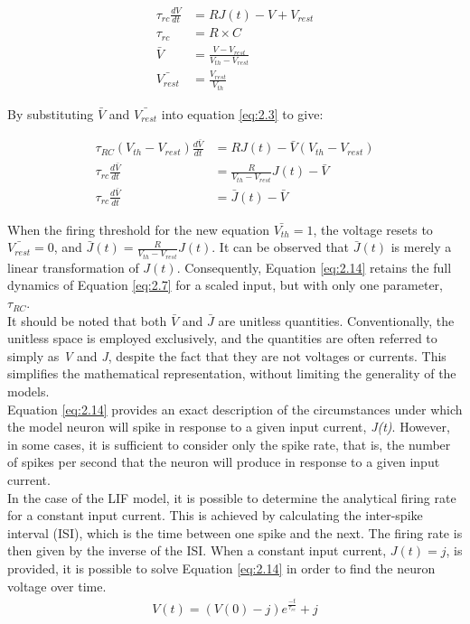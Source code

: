 \begin{align}
\tau_{rc} \frac{dV}{dt} &= RJ(t) - V + V_{rest} \label{eq:2.8} \\
\tau_{rc} &= R \times C \label{eq:2.9} \\
\bar{V} &= \frac{V - V_{rest}}{V_{th} - V_{rest}} \label{eq:2.10} \\
\bar{V_{rest}} &= \frac{V_{rest}}{V_{th}} \label{eq:2.11} 
\end{align}

\noindent By substituting $\bar{V}$ and $\bar{V_{rest}}$ into equation \ref{eq:2.3} to give:


\begin{align}
\tau_{RC}(V_{th} - V_{rest})\frac{d\bar{V}}{dt} &= RJ(t) - \bar{V}(V_{th} - V_{rest})
 \label{eq:2.12} \\
\tau_{rc}\frac{d\bar{V}}{dt} &= \frac{R}{V_{th} - V_{rest}} J(t) - \bar{V} \label{eq:2.13} \\
\tau_{rc} \frac{d\bar{V}}{dt} &= \bar{J}(t) - \bar{V} \label{eq:2.14} 
\end{align}

\noindent When the firing threshold for the new equation $\bar{V_{th}} = 1$, the voltage resets to $\bar{V_{rest}} = 0$, and $\bar{J}(t) = \frac{R}{V_{th} - V_{rest}} J(t)$. It can be observed that $\bar{J}(t)$ is merely a linear transformation of $J(t)$. Consequently, Equation \ref{eq:2.14} retains the full dynamics of Equation \ref{eq:2.7} for a scaled input, but with only one parameter, $\tau_{RC}$. \\

\noindent It should be noted that both $\bar{V}$ and $\bar{J}$ are unitless quantities. Conventionally, the unitless space is employed exclusively, and the quantities are often referred to simply as \textit{V} and \textit{J}, despite the fact that they are not voltages or currents. This simplifies the mathematical representation, without limiting the generality of the models. \\

\noindent Equation \ref{eq:2.14} provides an exact description of the circumstances under which the model neuron will spike in response to a given input current, \textit{J(t)}. However, in some cases, it is sufficient to consider only the spike rate, that is, the number of spikes per second that the neuron will produce in response to a given input current. \\

\noindent In the case of the LIF model, it is possible to determine the analytical firing rate for a constant input current. This is achieved by calculating the inter-spike interval (ISI), which is the time between one spike and the next. The firing rate is then given by the inverse of the ISI. When a constant input current, $J(t) = j$, is provided, it is possible to solve Equation \ref{eq:2.14} in order to find the neuron voltage over time. 
\begin{align}
V(t) = (V(0) - j)e^{\frac{-t}{\tau_{rc}}} + j \label{eq:2.15}
\end{align}


